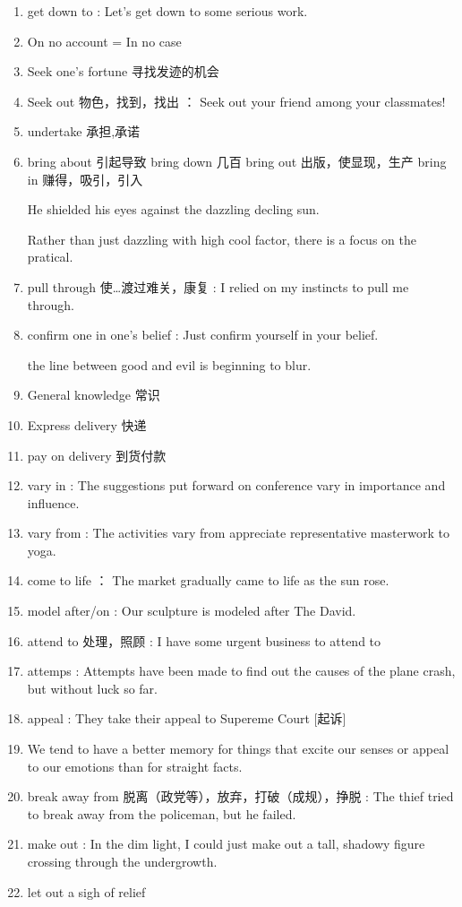 \documentclass[utf8]{ctexart}
\begin{document}
\begin{enumerate}
				\item get down to : Let's get down to some serious work.
				\item On no account = In no case
				\item Seek one's fortune 寻找发迹的机会
				\item Seek out 物色，找到，找出 ： Seek out your friend among
						your classmates! 
				\item undertake 承担,承诺
				\item bring about 引起导致 bring down 几百 bring out 出版，使显现，生产 bring in 赚得，吸引，引入
				\par He shielded his eyes against the dazzling decling sun.		
				\par Rather than just dazzling with high cool factor, there is a focus on the pratical.
				\item pull through 使\ldots 渡过难关，康复 : I relied on my instincts to pull me through.
				\item confirm one in one's belief : Just confirm yourself in your belief.	
				\par the line between good and evil is beginning to blur.	
				 \item General knowledge 常识
				 \item Express delivery 快递
				 \item pay on delivery 到货付款
				 \item vary in : The suggestions put forward on conference vary in importance and influence.
				 \item vary from : The activities vary from appreciate representative masterwork to yoga.
				 \item come to life ： The market gradually came to life as the sun rose.
				 \item model after/on : Our sculpture is modeled after The David.
				 \item attend to 处理，照顾 : I have some urgent business to attend to  			
			     \item attemps : Attempts have been made to find out the causes of the plane crash, but without luck so far.
				\item appeal : They take their appeal to Supereme Court	[起诉]
				\item We tend to have a better memory for things that excite our senses or appeal to our emotions than for straight facts.		
				\item break away from 脱离（政党等），放弃，打破（成规），挣脱 : The thief tried to break away from the policeman, but he failed.
				\item make out : In the dim light, I could just make out a tall, shadowy figure crossing through the undergrowth.
				\item let out a sigh of relief  		
		

\end{enumerate}
\end{document}
